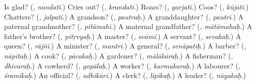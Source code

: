 \begin{tcolorbox}[breakable,colback=teal!4,colframe=teal!35!black,title={Before you move on}]
Is glad? (\textbf{}, \emph{nandati}.) Cries out? (\textbf{}, \emph{krandati}.) Roars? (\textbf{}, \emph{garjati}.) Coos? (\textbf{}, \emph{kūjati}.) Chatters? (\textbf{}, \emph{jalpati}.) A grandson? (\textbf{}, \emph{pautraḥ}.) A granddaughter? (\textbf{}, \emph{pautrī}.) A paternal grandmother? (\textbf{}, \emph{pitāmahī}.) A maternal grandfather? (\textbf{}, \emph{mātāmahaḥ}.) A father's brother? (\textbf{}, \emph{pitṛvyaḥ}.) A master? (\textbf{}, \emph{svāmī}.) A servant? (\textbf{}, \emph{sevakaḥ}.) A queen? (\textbf{}, \emph{rājñī}.) A minister? (\textbf{}, \emph{mantrī}.) A general? (\textbf{}, \emph{senāpatiḥ}.) A barber? (\textbf{}, \emph{nāpitaḥ}.) A cook? (\textbf{}, \emph{pācakaḥ}.) A gardener? (\textbf{}, \emph{mālākāraḥ}.) A fisherman? (\textbf{}, \emph{dhīvaraḥ}.) A cowherd? (\textbf{}, \emph{gopālaḥ}.) A worker? (\textbf{}, \emph{karmakaraḥ}.) A labourer? (\textbf{}, \emph{śramikaḥ}.) An official? (\textbf{}, \emph{adhikārī}.) A clerk? (\textbf{}, \emph{lipikaḥ}.) A leader? (\textbf{}, \emph{nāyakaḥ}.)
\end{tcolorbox}
